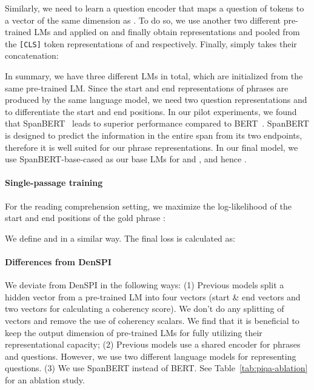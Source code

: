 \documentclass[11pt,a4paper]{article}
\begin{document}
Similarly, we need to learn a question encoder  that maps a question of  tokens  to a vector of the same dimension as . To do so, we use another two different pre-trained LMs  and  applied on  and finally obtain representations  and  pooled from the \texttt{[CLS]} token representations of  and  respectively. Finally,  simply takes their concatenation:
\vspace{-1em}

\vspace{-1.5em}










In summary, we have three different LMs in total, which are initialized from the same pre-trained LM.
Since the start and end representations of phrases are produced by the same language model, we need two question representations  and  to differentiate the start and end positions.
In our pilot experiments, we found that SpanBERT~\citep{joshi2020spanbert} leads to superior performance compared to BERT~\cite{devlin2019bert}.
SpanBERT is designed to predict the information in the entire span from its two endpoints, therefore it is well suited for our phrase representations.
In our final model, we use SpanBERT-base-cased as our base LMs for  and , and hence .










\paragraph{Single-passage training}
For the reading comprehension setting, we maximize the log-likelihood of the start and end positions of the gold phrase :

We define  and  in a similar way. The final loss is calculated as:


\paragraph{Differences from DenSPI}
We deviate from DenSPI in the following ways: (1) Previous models split a hidden vector from a pre-trained LM into four vectors (start \& end vectors and two vectors for calculating a coherency score).
We don't do any splitting of vectors and remove the use of coherency scalars. We find that it is beneficial to keep the output dimension of pre-trained LMs for fully utilizing their representational capacity; (2) Previous models use a shared encoder for phrases and questions.
However, we use two different language models for representing questions. (3) We use SpanBERT instead of BERT. See Table~\ref{tab:piqa-ablation} for an ablation study.
\end{document}
